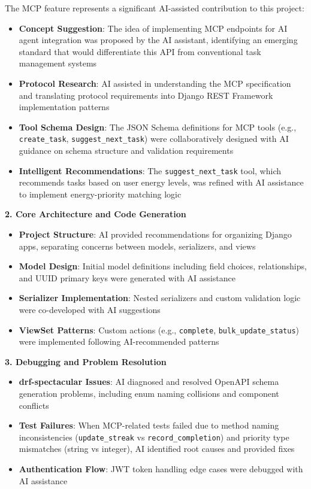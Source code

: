 \documentclass[11pt,a4paper]{article}
\begin{document}
The MCP feature represents a significant AI-assisted contribution to this project:
\begin{itemize}[noitemsep]
    \item \textbf{Concept Suggestion}: The idea of implementing MCP endpoints for AI agent integration was proposed by the AI assistant, identifying an emerging standard that would differentiate this API from conventional task management systems
    \item \textbf{Protocol Research}: AI assisted in understanding the MCP specification and translating protocol requirements into Django REST Framework implementation patterns
    \item \textbf{Tool Schema Design}: The JSON Schema definitions for MCP tools (e.g., \texttt{create\_task}, \texttt{suggest\_next\_task}) were collaboratively designed with AI guidance on schema structure and validation requirements
    \item \textbf{Intelligent Recommendations}: The \texttt{suggest\_next\_task} tool, which recommends tasks based on user energy levels, was refined with AI assistance to implement energy-priority matching logic
\end{itemize}

\textbf{2. Core Architecture and Code Generation}

\begin{itemize}[noitemsep]
    \item \textbf{Project Structure}: AI provided recommendations for organizing Django apps, separating concerns between models, serializers, and views
    \item \textbf{Model Design}: Initial model definitions including field choices, relationships, and UUID primary keys were generated with AI assistance
    \item \textbf{Serializer Implementation}: Nested serializers and custom validation logic were co-developed with AI suggestions
    \item \textbf{ViewSet Patterns}: Custom actions (e.g., \texttt{complete}, \texttt{bulk\_update\_status}) were implemented following AI-recommended patterns
\end{itemize}

\textbf{3. Debugging and Problem Resolution}

\begin{itemize}[noitemsep]
    \item \textbf{drf-spectacular Issues}: AI diagnosed and resolved OpenAPI schema generation problems, including enum naming collisions and component conflicts
    \item \textbf{Test Failures}: When MCP-related tests failed due to method naming inconsistencies (\texttt{update\_streak} vs \texttt{record\_completion}) and priority type mismatches (string vs integer), AI identified root causes and provided fixes
    \item \textbf{Authentication Flow}: JWT token handling edge cases were debugged with AI assistance
\end{itemize}
\end{document}
